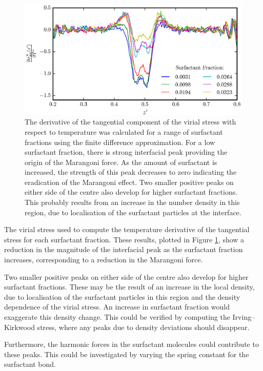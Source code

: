 \begin{figure}[h!]
\centering
\includegraphics[scale=1.0]{SurfForce}
\caption{The derivative of the tangential component of the virial stress with respect to temperature was calculated for a range of surfactant fractions using the finite difference approximation.
For a low surfactant fraction, there is strong interfacial peak providing the origin of the Marangoni force.
As the amount of surfactant is increased, the strength of this peak decreases to zero indicating the eradication of the Marangoni effect.
Two smaller positive peaks on either side of the centre also develop for higher surfactant fractions.
This probably results from an increase in the number density in this region, due to localisation of the surfactant particles at the interface.
}
\label{SurfForce}
\end{figure}

The virial stress used to compute the temperature derivative of the tangential stress for each surfactant fraction.
These results, plotted in Figure \ref{SurfForce}, show a reduction in the magnitude of the interfacial peak as the surfactant fraction increases, corresponding to a reduction in the Marangoni force.

Two smaller positive peaks on either side of the centre also develop for higher surfactant fractions.
These may be the result of an increase in the local density, due to localisation of the surfactant particles in this region and the density dependence of the virial stress.
An increase in surfactant fraction would exaggerate this density change.
This could be verified by computing the Irving--Kirkwood stress, where any peaks due to density deviations should disappear.

Furthermore, the harmonic forces in the surfactant molecules could contribute to these peaks.
This could be investigated by varying the spring constant for the surfactant bond.
\FloatBarrier

